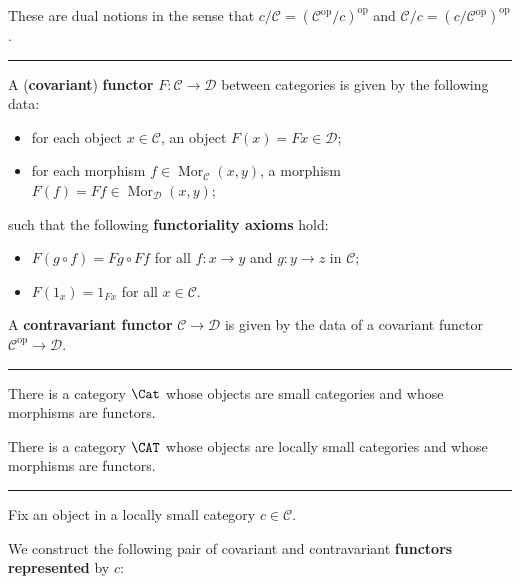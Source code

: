 \documentclass[12pt]{article}
\newcommand{\keyword}[1]{\textbf{#1}}
\newcommand{\sepline}{\rule{\textwidth}{0.4pt}}
\theoremstyle{definition}
\newcommand{\CC}{\mathcal{C}}
\newcommand{\DD}{\mathcal{D}}
\newcommand{\<}{\left\langle}
\renewcommand{\>}{\right\rangle}
\newcommand{\Mapsto}{\longmapsto}
\DeclareMathOperator{\Mor}{Mor}
\newcommand{\op}{\mathrm{op}}
\begin{document}
These are dual notions in the sense that $c/\CC = (\CC^\op/c)^\op$ and $\CC/c = (c/\CC^\op)^\op$.

\sepline

A (\keyword{covariant}) \keyword{functor} $F : \CC \to \DD$ between categories is given by the following data:
\begin{itemize}
    \item for each object $x \in \CC$, an object $F(x) = Fx \in \DD$;
    \item for each morphism $f \in \Mor_\CC(x, y)$, a morphism $F(f) = Ff \in \Mor_\DD(x, y)$;
\end{itemize}
such that the following \keyword{functoriality axioms} hold:
\begin{itemize}
    \item $F(g \circ f) = Fg \circ Ff$ for all $f : x \to y$ and $g : y \to z$ in $\CC$;
    \item $F(1_x) = 1_{Fx}$ for all $x \in \CC$.
\end{itemize}

A \keyword{contravariant functor} $\CC \to \DD$ is given by the data of a covariant functor $\CC^\op \to \DD$.

\sepline

There is a category $\Cat$ whose objects are small categories and whose morphisms are functors.

There is a category $\CAT$ whose objects are locally small categories and whose morphisms are functors.

\sepline

Fix an object in a locally small category $c \in \CC$.

We construct the following pair of covariant and contravariant \keyword{functors represented} by $c$:
\begin{center}
    \hspace*{2cm}
\end{center}
\end{document}
